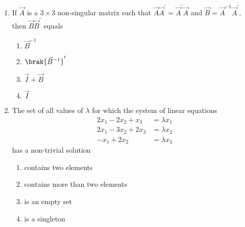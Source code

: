 \begin{enumerate}
%
	\item If $\vec{A}$ is a $3\times3$ non-singular matrix such that $\vec{A}\vec{A}^{\prime}=\vec{A}^{\prime}\vec{A}$ and $\vec{B}=\vec{A}^{-1}\vec{A}^{\prime}$, then $\vec{B}\vec{B}^{\prime}$ equals
	\hfill {}{\par}
\begin{multicols}{4}
	\begin{enumerate}
	    	\item $\vec{B}^{-1}$
		\item $\brak{\vec{B}^{-1}}^{\prime}$
		\item $\vec{I}+\vec{B}$ 
		\item $\vec{I}$
        \end{enumerate}
\end{multicols}
%
    \item The set of all values of $\lambda$ for which the system of linear equations
	\begin{align*}
		2x_1-2x_2+x_3 &= \lambda x_1\\
		2x_1-3x_2+2x_3 &= \lambda x_2\\
		-x_1+2x_2 &= \lambda x_3
	\end{align*}
	has a non-trivial solution
	\hfill{}
\begin{multicols}{2}
	\begin{enumerate}
		\item contains two elements
		\item contains more than two elements
		\item is an empty set
		\item is a singleton
	\end{enumerate}
\end{multicols}
%


\end{enumerate}
